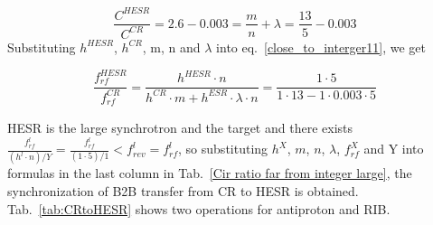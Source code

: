 \begin{equation}
\frac{C^{\mathit{HESR}}}{C^{\mathit{CR}}}=2.6-0.003=\frac{m}{n}+ \lambda = \frac{13}{5}-0.003
\end{equation}
Substituting $h^{\mathit{HESR}}$, $h^{\mathit{CR}}$, m, n and $\lambda$ into eq.~\ref{close_to_interger11}, we get

\begin{equation} 
\frac{f_{\mathit{rf}}^{\mathit{HESR}}}{f_{\mathit{rf}}^{\mathit{CR}}}=\frac{h^{\mathit{HESR}}\cdot n}{h^{\mathit{CR}} \cdot m+ h^{\mathit{ESR}} \cdot\lambda\cdot n}=\frac{1\cdot 5}{1 \cdot 13- 1 \cdot 0.003\cdot 5}
\end{equation}

HESR is the large synchrotron and the target and there exists $\frac{f_{\mathit{rf}}^{l}}{(h^l\cdot n)/Y}=\frac{f_{\mathit{rf}}^{l}}{(1\cdot 5)/1}<f_{\mathit{rev}}^{l}=f_{\mathit{rf}}^{l}$, so substituting $h^X$, $m$, $n$, $\lambda$, $f_{\mathit{rf}}^{X}$ and Y into formulas in the last column in Tab.~\ref{Cir ratio far from integer large}, the synchronization of B2B transfer from CR to HESR is obtained. Tab.~\ref{tab:CRtoHESR} shows two operations for antiproton and RIB.



